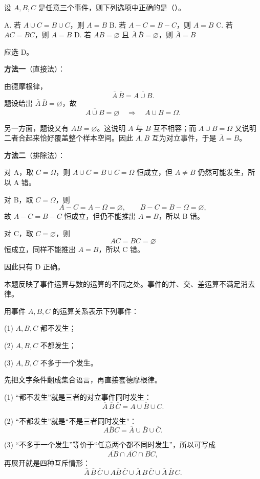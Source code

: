 ﻿\documentclass[lang=cn,11pt]{elegantbook}
\begin{document}
\begin{exercise}\label{exer:1-28}
设 \(A,B,C\) 是任意三个事件，则下列选项中正确的是（\quad）。\par
A. 若 \(A\cup C=B\cup C\)，则 \(A=B\)\quad
B. 若 \(A-C=B-C\)，则 \(A=B\)\quad
C. 若 \(AC=BC\)，则 \(A=B\)\quad
D. 若 \(AB=\varnothing\) 且 \(\overline{A}\,\overline{B}=\varnothing\)，则 \(\overline{A}=B\)
\end{exercise}

\begin{solution}
应选 D。

\textbf{方法一}（直接法）：

由德摩根律，
\[
\overline{A}\,\overline{B}=\overline{A\cup B}.
\]
题设给出 \(\overline{A}\,\overline{B}=\varnothing\)，故
\[
\overline{A\cup B}=\varnothing \quad\Longrightarrow\quad A\cup B=\Omega.
\]

另一方面，题设又有 \(AB=\varnothing\)。这说明 \(A\) 与 \(B\) 互不相容；而 \(A\cup B=\Omega\) 又说明二者合起来恰好覆盖整个样本空间。因此 \(A,B\) 互为对立事件，于是
\(\overline{A}=B\)。

\textbf{方法二}（排除法）：

对 A，取 \(C=\Omega\)，则 \(A\cup C=B\cup C=\Omega\) 恒成立，但 \(A\neq B\) 仍然可能发生，所以 A 错。

对 B，取 \(C=\Omega\)，则
\[
A-C=A-\Omega=\varnothing,\qquad B-C=B-\Omega=\varnothing,
\]
故 \(A-C=B-C\) 恒成立，但仍不能推出 \(A=B\)，所以 B 错。

对 C，取 \(C=\varnothing\)，则
\[
AC=BC=\varnothing
\]
恒成立，同样不能推出 \(A=B\)，所以 C 错。

因此只有 D 正确。
\end{solution}

\begin{note}
本题反映了事件运算与数的运算的不同之处。事件的并、交、差运算不满足消去律。
\end{note}

\begin{exercise}\label{exer:1-29}
用事件 \(A,B,C\) 的运算关系表示下列事件：\par
(1) \(A,B,C\) 都不发生；\par
(2) \(A,B,C\) 不都发生；\par
(3) \(A,B,C\) 不多于一个发生。
\end{exercise}

\begin{solution}
先把文字条件翻成集合语言，再直接套德摩根律。

(1) “都不发生”就是三者的对立事件同时发生：
\[
\overline{A}\,\overline{B}\,\overline{C}=\overline{A\cup B\cup C}.
\]

(2) “不都发生”就是“不是三者同时发生”：
\[
\overline{ABC}=\overline{A}\cup\overline{B}\cup\overline{C}.
\]

(3) “不多于一个发生”等价于“任意两个都不同时发生”，所以可写成
\[
\overline{AB}\cap\overline{AC}\cap\overline{BC},
\]
再展开就是四种互斥情形：
\[
\overline{A}\,\overline{B}\,\overline{C}\cup A\overline{B}\,\overline{C}\cup\overline{A}\,B\,\overline{C}\cup\overline{A}\,\overline{B}\,C.
\]
\end{solution}
\end{document}
